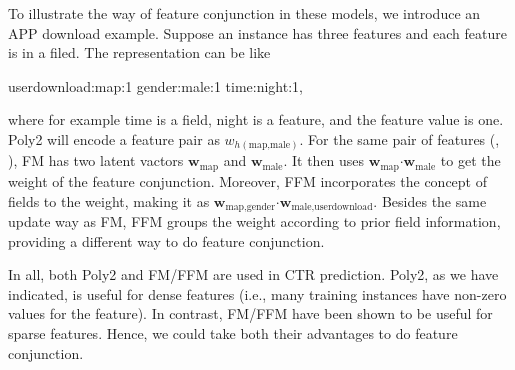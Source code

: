 To illustrate the way of feature conjunction in these models, we introduce an APP download example. Suppose an instance has three features and each feature is in a filed. The representation can be like 
\begin{center}
userdownload:map:1 gender:male:1 time:night:1,
\end{center}
where for example time is a field, night is a feature, and the feature value is one. Poly2 will encode a feature pair as $w_{h(\text{map,male})}$. For the same pair of features (, ), FM has two latent vactors $\boldsymbol{w}_{\text{map}}$ and $\boldsymbol{w}_{\text{male}}$. It then uses $\boldsymbol{w}_{\text{map}}$$\cdot$$\boldsymbol{w}_{\text{male}}$ to get the weight of the feature conjunction. Moreover, FFM incorporates the concept of fields to the weight, making it as $\boldsymbol{w}_{\text{map,gender}}$$\cdot$$\boldsymbol{w}_{\text{male,userdownload}}$. Besides the same update way as FM, FFM groups the weight according to prior field information, providing a different way to do feature conjunction.

In all, both Poly2 and FM/FFM are used in CTR prediction. Poly2, as we have indicated, is useful for dense features (i.e., many training instances have non-zero values for the feature). In contrast, FM/FFM have been shown to be useful for sparse features. Hence, we could take both their advantages to do feature conjunction.
